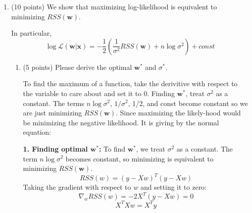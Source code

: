 \documentclass[11pt]{article}
\begin{document}
\begin{enumerate}
{$X$ is a row vector containing $n$ columns $(x_i)$, and $Y$ is a column vector containing $n$ rows $(y_i)^T$\

Using the rule of block matrix multiplication, the product $XY$ is obtained by multiplying the corresponding rows and columns and summing them up

\begin{align*}
XY &= \begin{bmatrix} x_1 & x_2 & \cdots & x_n \end{bmatrix} \begin{bmatrix} y_1^T \\ y_2^T \\ \vdots \\ y_n^T \end{bmatrix} \\
   &= x_1 \cdot y_1^T + x_2 \cdot y_2^T + \cdots + x_n \cdot y_n^T \\
   &= \sum_{i=1}^{n} x_i y_i^T
\end{align*}

Each term $x_i y_i^T$ represents the outer product of the $i$-th column of $X$ and the $i$-th row of $Y$, giving the sum of XY
}

\item (10 points) We show that maximizing log-likelihood is
equivalent to minimizing $RSS(\boldsymbol w)$.

In particular,
$$\log\mathcal{L}(\boldsymbol{w} | \boldsymbol{x}) 
= -\frac{1}{2}\left( \frac{1}{\sigma^2}RSS(\boldsymbol{w}) + n \log \sigma^2 \right) + const$$
\begin{enumerate}
    \item (5 points) Please derive the optimal $\boldsymbol w^*$ and $\sigma^*$.
    
    {\color{red}
     To find the maximum of a function, take the derivitive with respect to the variable to care about and set it to 0. Finding $\boldsymbol{w}^*$, treat $\sigma^2$ as a constant. The terms $n \log \sigma^2$, $1/\sigma^2$, 1/2, and const become constant so we are just minimizing $RSS(\boldsymbol{w})$. Since maximizing the likely-hood would be minimizing the negative likelihood. It is giving by the normal equation:


    \textbf{1. Finding optimal $\boldsymbol{w}^*$:}
    To find $\boldsymbol{w}^*$, we treat $\sigma^2$ as a constant. The term $n \log \sigma^2$ becomes constant, so minimizing is equivalent to minimizing $RSS(\boldsymbol{w})$.
    \[
    RSS({w}) = ({y} - X{w})^T ({y} - X{w})
    \]
    Taking the gradient with respect to ${w}$ and setting it to zero:
    \[
    \nabla_{{w}} RSS({w}) = -2X^T ({y} - X{w}) = 0
    \]
    \[
    X^T X {w} = X^T {y}
    \]
      
}
\end{enumerate}
\end{enumerate}
\end{document}
